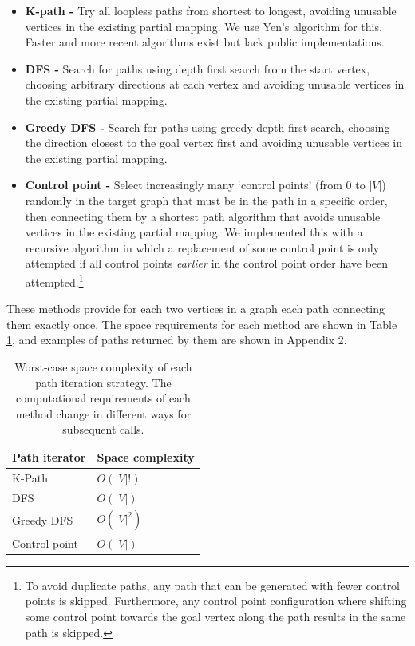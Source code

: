 \begin{itemize}
\item \textbf{K-path -} Try all loopless paths from shortest to longest, avoiding unusable vertices in the existing partial mapping. We use Yen's algorithm\cite{YensAlgorithm} for this. Faster and more recent algorithms exist\cite{Hershberger, Brander1996} but lack public implementations.

\item \textbf{DFS -} Search for paths using depth first search from the start vertex, choosing arbitrary directions at each vertex and avoiding unusable vertices in the existing partial mapping.

\item \textbf{Greedy DFS -} Search for paths using greedy depth first search, choosing the direction closest to the goal vertex first and avoiding unusable vertices in the existing partial mapping.

\item \textbf{Control point -} Select increasingly many `control points' (from $0$ to $|V|$) randomly in the target graph that must be in the path in a specific order, then connecting them by a shortest path algorithm that avoids unusable vertices in the existing partial mapping. We implemented this with a recursive algorithm in which a replacement of some control point is only attempted if all control points \textit{earlier} in the control point order have been attempted.\footnote{To avoid duplicate paths, any path that can be generated with fewer control points is skipped. Furthermore, any control point configuration where shifting some control point towards the goal vertex along the path results in the same path is skipped.}
\end{itemize}

These methods provide for each two vertices in a graph each path connecting them exactly once. The space requirements for each method are shown in Table \ref{tab:iterator-spacerequirements}, and examples of paths returned by them are shown in Appendix 2.

\begin{table}[]
\centering
\begin{tabular}{|l|l|}
\hline
\textbf{Path iterator} & \textbf{Space complexity} \\ \hline
K-Path                 & $O(|V|!)$                 \\ \hline
DFS                    & $O(|V|)$                  \\ \hline
Greedy DFS             & $O(|V|^2)$                \\ \hline
Control point          & $O(|V|)$                  \\ \hline
\end{tabular}
\caption{Worst-case space complexity of each path iteration strategy. The computational requirements of each method change in different ways for subsequent calls.}
\label{tab:iterator-spacerequirements}
\end{table}




